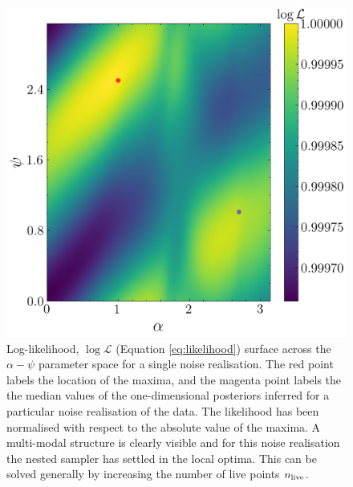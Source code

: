 \documentclass[fleqn,usenatbib,useAMS]{mnras}
\begin{document}
\begin{figure}
	\centering
	\includegraphics[width=\columnwidth]{images/likelihood_surface_alpha_psi}
	\caption{Log-likelihood, $\log \mathcal{L}$ (Equation \ref{eq:likelihood}) surface across the $\alpha-\psi$ parameter space for a single noise realisation.  The red point labels the location of the maxima, and the magenta point labels the the median values of the one-dimensional posteriors inferred for a particular noise realisation of the data. The likelihood has been normalised with respect to the absolute value of the maxima. A multi-modal structure is clearly visible and for this noise realisation the nested sampler has settled in the local optima. This can be solved generally by increasing the number of live points $n_{\rm live}$.}
	\label{fig:likelihood_surface_alpha_psi}
\end{figure}
\end{document}
